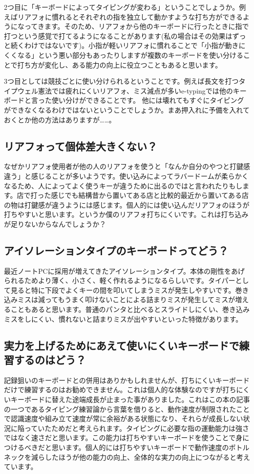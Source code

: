 2つ目に「キーボードによってタイピングが変わる」ということでしょうか。例えばリアフォに慣れるとそれぞれの指を独立して動かすような打ち方ができるようになってきます。そのため、リアフォから他のキーボードに行ったときに指で打つという感覚で打てるようになることがあります(私の場合はその効果はずっと続くわけではないです)。小指が軽いリアフォに慣れることで「小指が動きにくくなる」という悪い部分もあったりしますが複数のキーボードを使い分けることで打ち方が変化し、ある能力の向上に役立つこともあると思います。

3つ目としては競技ごとに使い分けられるということです。例えば長文を打つタイプウェル憲法では疲れにくいリアフォ、ミス減点が多いe-typingでは他のキーボードと言った使い分けができることです。
他には壊れてもすぐにタイピングができなくなるわけではないということでしょうか。まあ押入れに予備を入れておくとか他の方法はありますが……。

\subsection{リアフォって個体差大きくない？}
なぜかリアフォ使用者が他の人のリアフォを使うと「なんか自分のやつと打鍵感違う」と感じることが多いようです。使い込みによってラバードームが柔らかくなるため、人によってよく使うキーが違うために出るのではと言われたりもします。店で打った感じでも結構昔から置いてある店と比較的最近から置いてある店の物は打鍵感が違うようには感じます。個人的には使い込んだリアフォのほうが打ちやすいと思います。というか僕のリアフォ打ちにくいです。これは打ち込みが足りないからなんでしょうか？

\subsection{アイソレーションタイプのキーボードってどう？}
最近ノートPCに採用が増えてきたアイソレーションタイプ。本体の剛性をあげられるためより薄く、小さく、軽く作れるようになるらしいです。タイパーとして見ると特に下段でよくキーの間を叩いてしまうミスが発生しやすいです。巻き込みミスは減ってもうまく叩けないことによる詰まりミスが発生してミスが増えることもあると思います。普通のパンタと比べるとスライドしにくい、巻き込みミスをしにくい、慣れないと詰まりミスが出やすいといった特徴があります。

\subsection{実力を上げるためにあえて使いにくいキーボードで練習するのはどう？}
記録狙いのキーボードとの併用はありかもしれませんが、打ちにくいキーボードだけで練習するのはお勧めできません。これは個人的な体験なのですが打ちにくいキーボードに替えた途端成長が止まった事がありました。これはこの本の記事の一つであるタイピング練習論から言葉を借りると、動作速度が制限されたことで認識速度や組み立て速度が常に余裕がある状態になり、それらが成長しない状況に陥っていたためだと考えられます。タイピングに必要な指の運動能力は強さではなく速さだと思います。この能力は打ちやすいキーボードを使うことで身につけるべきだと思います。個人的には打ちやすいキーボードで動作速度のボトルネックを減らしたほうが他の能力の向上、全体的な実力の向上につながると考えています。

